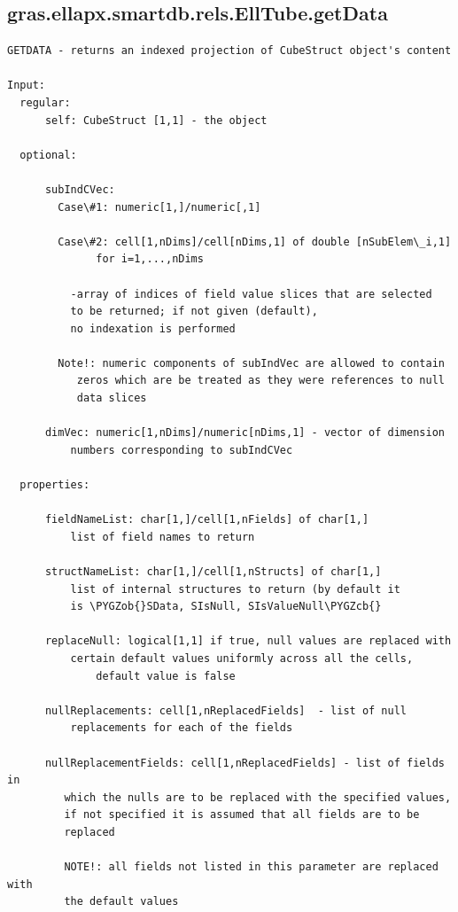 \documentclass[letterpaper,10pt,english]{sphinxmanual}
\def\PYGZob{\char`\{}
\def\PYGZcb{\char`\}}
\begin{document}
\subsection{gras.ellapx.smartdb.rels.EllTube.getData}
\label{chap_functions:gras-ellapx-smartdb-rels-elltube-getdata}
\begin{Verbatim}[commandchars=\\\{\}]
GETDATA - returns an indexed projection of CubeStruct object's content

Input:
  regular:
      self: CubeStruct [1,1] - the object

  optional:

      subIndCVec:
        Case\#1: numeric[1,]/numeric[,1]

        Case\#2: cell[1,nDims]/cell[nDims,1] of double [nSubElem\_i,1]
              for i=1,...,nDims

          -array of indices of field value slices that are selected
          to be returned; if not given (default),
          no indexation is performed

        Note!: numeric components of subIndVec are allowed to contain
           zeros which are be treated as they were references to null
           data slices

      dimVec: numeric[1,nDims]/numeric[nDims,1] - vector of dimension
          numbers corresponding to subIndCVec

  properties:

      fieldNameList: char[1,]/cell[1,nFields] of char[1,]
          list of field names to return

      structNameList: char[1,]/cell[1,nStructs] of char[1,]
          list of internal structures to return (by default it
          is \PYGZob{}SData, SIsNull, SIsValueNull\PYGZcb{}

      replaceNull: logical[1,1] if true, null values are replaced with
          certain default values uniformly across all the cells,
              default value is false

      nullReplacements: cell[1,nReplacedFields]  - list of null
          replacements for each of the fields

      nullReplacementFields: cell[1,nReplacedFields] - list of fields in
         which the nulls are to be replaced with the specified values,
         if not specified it is assumed that all fields are to be
         replaced

         NOTE!: all fields not listed in this parameter are replaced with
         the default values


\end{Verbatim}
\end{document}
